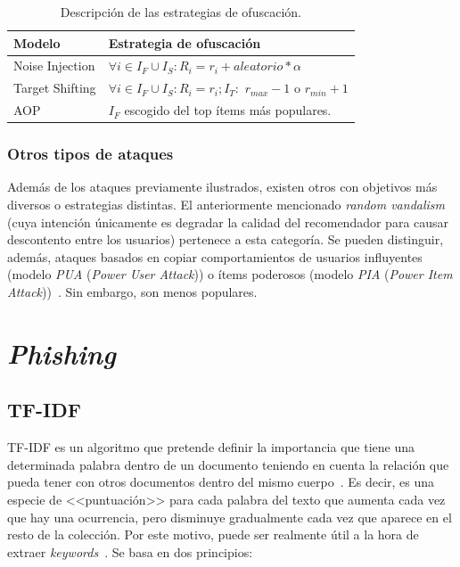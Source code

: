 \begin{table}
\small
\begin{centering}
	
		\begin{tabular}{@{}p{10em} p{20em}@{}}
		\toprule
		\textbf{Modelo} & \textbf{Estrategia de ofuscación}\\ 
		\midrule
			
		Noise Injection & $\forall i \in I_F \cup I_S: R_i = r_i + aleatorio * \alpha$\\
		Target Shifting & $\forall i \in I_F \cup I_S: R_i = r_i; I_T:$ $r_{max}-1$ o $r_{min}+1$\\
		AOP & $I_F$ escogido del top ítems más populares.\\
			
		\bottomrule
		\end{tabular}

\end{centering}
\caption[Sistemas de recomendación: estrategias de ofuscación]{Descripción de las estrategias de ofuscación.}	\label{tabla_descripcion_estrategias_ofuscación}
\end{table}

\subsubsection{Otros tipos de ataques}

Además de los ataques previamente ilustrados, existen otros con objetivos más diversos o estrategias distintas. El anteriormente mencionado \textit{random vandalism} (cuya intención únicamente es degradar la calidad del recomendador para causar descontento entre los usuarios) pertenece a esta categoría. Se pueden distinguir, además, ataques basados en copiar comportamientos de usuarios influyentes (modelo \textit{PUA} (\textit{Power User Attack})) o ítems poderosos (modelo \textit{PIA} (\textit{Power Item Attack}))~\cite{mingdan2018ShillingAttacksAReview}. Sin embargo, son menos populares.


\section{\textit{Phishing}}

\subsection{TF-IDF}

TF-IDF es un algoritmo que pretende definir la importancia que tiene una determinada palabra dentro de un documento teniendo en cuenta la relación que pueda tener con otros documentos dentro del mismo cuerpo~\cite{tfidfmarius2020}. Es decir, es una especie de <<puntuación>> para cada palabra del texto que aumenta cada vez que hay una ocurrencia, pero disminuye gradualmente cada vez que aparece en el resto de la colección. Por este motivo, puede ser realmente útil a la hora de extraer \textit{keywords}~\cite{cantinatfidf}. Se basa en dos principios:

